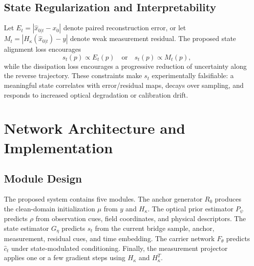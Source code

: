 \documentclass[journal]{IEEEtran}
\newcommand{\hk}{H_{\kappa}}
\begin{document}
\subsection{State Regularization and Interpretability}
Let $E_t=|\hat{x}_{0|t}-x_0|$ denote paired reconstruction error, or let $M_t=|\hk(\hat{x}_{0|t})-y|$ denote weak measurement residual. The proposed state alignment loss encourages
\begin{equation}
    s_t(p) \propto E_t(p) \quad \text{or} \quad s_t(p) \propto M_t(p),
\end{equation}
while the dissipation loss encourages a progressive reduction of uncertainty along the reverse trajectory. These constraints make $s_t$ experimentally falsifiable: a meaningful state correlates with error/residual maps, decays over sampling, and responds to increased optical degradation or calibration drift.

\section{Network Architecture and Implementation}
\subsection{Module Design}
The proposed system contains five modules. The anchor generator $R_0$ produces the clean-domain initialization $\mu$ from $y$ and $\hk$. The optical prior estimator $P_\psi$ predicts $\rho$ from observation cues, field coordinates, and physical descriptors. The state estimator $G_\eta$ predicts $s_t$ from the current bridge sample, anchor, measurement, residual cues, and time embedding. The carrier network $F_\theta$ predicts $\hat c_t$ under state-modulated conditioning. Finally, the measurement projector applies one or a few gradient steps using $\hk$ and $\hk^T$.
\end{document}
